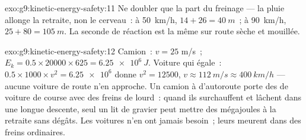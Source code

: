 \begin{solution}{exo:g9:kinetic-energy-safety:11}
Ne doubler que la part du freinage --- la pluie allonge la retraite,
non le cerveau~: à \qty{50}{km/h}, $14 + 26 = \qty{40}{m}$~; à
\qty{90}{km/h}, $25 + 80 = \qty{105}{m}$. La seconde de réaction est
la même sur route sèche et mouillée.
\end{solution}

\begin{solution}{exo:g9:kinetic-energy-safety:12}
Camion~: $v = 25$ \unit{m/s}~;
$E_k = 0.5 \times 20000 \times 625 = \qty{6.25e6}{J}$. Voiture qui
égale~: $0.5 \times 1000 \times v^2 = \num{6.25e6}$ donne
$v^2 = 12500$, $v \approx \qty{112}{m/s} \approx \qty{400}{km/h}$ ---
aucune voiture de route n'en approche. Un camion à 
d'autoroute porte des  de voiture de course avec des freins de
 lourd~: quand ils surchauffent et lâchent dans une longue
descente, seul un lit de gravier peut mettre des mégajoules à la
retraite sans dégâts. Les voitures n'en ont jamais besoin~; leurs
 meurent dans des freins ordinaires.
\end{solution}

